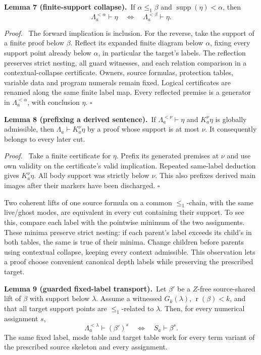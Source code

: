 \documentclass[11pt]{article}
\newcommand{\rk}{\operatorname{r}}
\newcommand{\supp}{\operatorname{supp}}
\newcommand{\cut}[2]{\Lambda_{#1}^{< #2}}
\newcommand{\qed}{\hfill\ensuremath{\square}}
\newenvironment{proof}{\par\emph{Proof.}\ }{\qed\par}
\newcommand{\statement}[2]{\par\textbf{#1.}\ #2\par}
\begin{document}
\statement{Lemma 7 (finite-support collapse)}{If
$\alpha\le_1\beta$ and $\supp(\eta)<\alpha$, then
\begin{equation}\label{eq:collapse}
 \cut a\alpha\vdash\eta\quad\Longleftrightarrow\quad
 \cut a\beta\vdash\eta.
\end{equation}}

\begin{proof}
The forward implication is inclusion. For the reverse, take the support
of a finite proof below $\beta$. Reflect its expanded finite diagram
below $\alpha$, fixing every support point already below $\alpha$,
in particular the target's labels. The reflection preserves strict
nesting, all guard witnesses, and each relation comparison in a
contextual-collapse certificate. Owners, source formulas, protection
tables, variable data and program numerals remain fixed. Logical
certificates are renamed along the same finite label map. Every
reflected premise is a generator in $\cut a\alpha$, with conclusion
$\eta$.
\end{proof}

\statement{Lemma 8 (prefixing a derived sentence)}{If
$\cut a\nu\vdash\eta$ and $K_a^\nu\eta$ is globally admissible,
then $\Lambda_a\vdash K_a^\nu\eta$ by a proof whose support is at
most $\nu$. It consequently belongs to every later cut.}

\begin{proof}
Take a finite certificate for $\eta$. Prefix its generated premises at
$\nu$ and use own validity on the certificate's valid implication.
Repeated same-label deduction gives $K_a^\nu\eta$. All body support
was strictly below $\nu$. This also prefixes derived main images after
their markers have been discharged.
\end{proof}

Two coherent lifts of one source formula on a common $\le_1$-chain,
with the same live/ghost modes, are equivalent in every cut containing
their support. To see this, compare each label with the pointwise
minimum of the two assignments. These minima preserve strict nesting:
if each parent's label exceeds its child's in both tables, the same
is true of their minima. Change children before parents using
contextual collapse, keeping every context admissible. This observation
lets a proof choose convenient canonical depth labels while preserving
the prescribed target.

\statement{Lemma 9 (guarded fixed-label transport)}{Let $\beta'$ be a
$Z$-free source-shared lift of $\beta$ with support below $\lambda$.
Assume a witnessed $G_k(\lambda)$, $\rk(\beta)<k$, and that all target
support points are $\le_1$-related to $\lambda$. Then, for every
numerical assignment $s$,
\begin{equation}\label{eq:fixed-transport}
 \cut a\lambda\vdash(\beta')^s
       \quad\Longleftrightarrow\quad S_a\vdash\beta^s.
\end{equation}
The same fixed label, mode table and target table work for every term
variant of the prescribed source skeleton and every assignment.}
\end{document}
